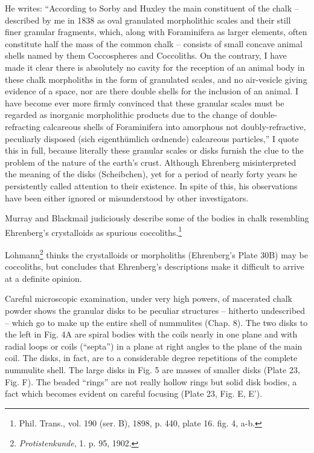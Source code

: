 \documentclass[a4paper, 12pt, oneside]{article}
\begin{document}
He writes: ``According to Sorby and Huxley the main constituent of the chalk -- described by me in 1838 as oval granulated morpholithic scales and their still finer granular fragments, which, along with Foraminifera as larger elements, often constitute half the mass of the common chalk -- consists of small concave animal shells named by them Coccospheres and Coccoliths. On the contrary, I have made it clear there is absolutely no cavity for the reception of an animal body in these chalk morpholiths in the form of granulated scales, and no air-vesicle giving evidence of a space, nor are there double shells for the inclusion of an animal. I have become ever more firmly convinced that these granular scales must be regarded as inorganic morpholithic products due to the change of double-refracting calcareous shells of Foraminifera into amorphous not doubly-refractive, peculiarly disposed (sich eigenthümlich ordnende) calcareous particles,'' I quote this in full, because literally these granular scales or disks furnish the clue to the problem of the nature of the earth's crust. Although Ehrenberg misinterpreted the meaning of the disks (Scheibchen), yet for a period of nearly forty years he persistently called attention to their existence. In spite of this, his observations have been either ignored or misunderstood by other investigators.

Murray and Blackmail judiciously describe some of the bodies in chalk resembling Ehrenberg's crystalloids as spurious coccoliths.\footnote{Phil. Trans., vol. 190 (ser. B), 1898, p. 440, plate 16. fig. 4, a-b.}

Lohmann\footnote{\emph{Protistenkunde}, 1. p. 95, 1902.} thinks the crystalloids or morpholiths (Ehrenberg's Plate 30B) may be coccoliths, but concludes that Ehrenberg's descriptions make it difficult to arrive at a definite opinion.

Careful microscopic examination, under very high powers, of macerated chalk powder shows the granular disks to be peculiar structures -- hitherto undescribed -- which go to make up the entire shell of nummulites (Chap. 8). The two disks to the left in Fig. 4A are spiral bodies with the coils nearly in one plane and with radial loops or coils (``septa'') in a plane at right angles to the plane of the main coil. The disks, in fact, are to a considerable degree repetitions of the complete nummulite shell. The large disks in Fig. 5 are masses of smaller disks (Plate 23, Fig. F). The beaded ``rings'' are not really hollow rings but solid disk bodies, a fact which becomes evident on careful focusing (Plate 23, Fig. E, E').
\end{document}
